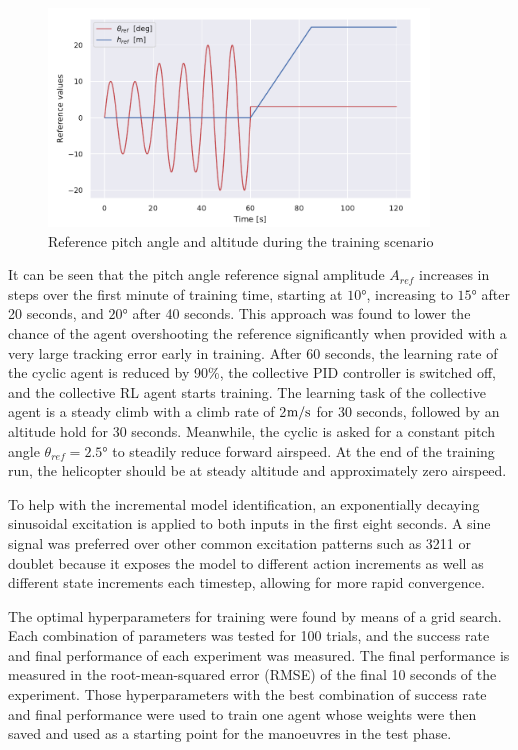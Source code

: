 \begin{figure}[ht]
    \centering
    \includegraphics[width=0.9\textwidth]{fig/4/reference_training.pdf}
    \caption[]{Reference pitch angle and altitude during the training scenario}
    \label{fig:reference_training}
\end{figure}

It can be seen that the pitch angle reference signal amplitude $A_{ref}$ increases in steps over the first minute of training time, starting at $10\si{\degree}$, increasing to $15\si{\degree}$ after 20 seconds, and $20\si{\degree}$ after 40 seconds. This approach was found to lower the chance of the agent overshooting the reference significantly when provided with a very large tracking error early in training.
After 60 seconds, the learning rate of the cyclic agent is reduced by 90\%, the collective PID controller is switched off, and the collective RL agent starts training. The learning task of the collective agent is a steady climb with a climb rate of 2$\si[per-mode=symbol]{\meter \per \second}$ for 30 seconds, followed by an altitude hold for 30 seconds. Meanwhile, the cyclic is asked for a constant pitch angle $\theta_{ref} = 2.5\si{\degree}$ to steadily reduce forward airspeed. At the end of the training run, the helicopter should be at steady altitude and approximately zero airspeed. 

To help with the incremental model identification, an exponentially decaying sinusoidal excitation is applied to both inputs in the first eight seconds. A sine signal was preferred over other common excitation patterns such as 3211 or doublet because it exposes the model to different action increments as well as different state increments each timestep, allowing for more rapid convergence. 

The optimal hyperparameters for training were found by means of a grid search. Each combination of parameters was tested for 100 trials, and the success rate and final performance of each experiment was measured. The final performance is measured in the root-mean-squared error (RMSE) of the final 10 seconds of the experiment. Those hyperparameters with the best combination of success rate and final performance were used to train one agent whose weights were then saved and used as a starting point for the manoeuvres in the test phase.

